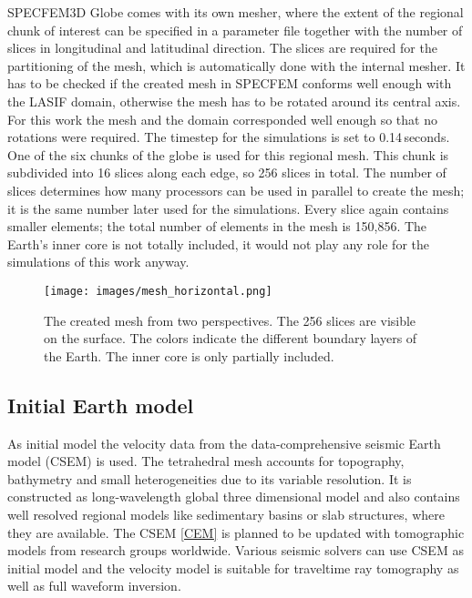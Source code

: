 SPECFEM3D Globe comes with its own mesher, where the extent of the regional chunk of interest can be 
specified in a parameter file together with the number of slices in longitudinal and latitudinal direction.
The slices are required for the partitioning of the mesh, which is automatically done with the internal mesher.
It has to be checked if the created mesh in SPECFEM conforms well enough with the LASIF domain, 
otherwise the mesh has to be rotated around its central axis.
For this work the mesh and the domain corresponded well enough so that no rotations were required.
The timestep for the simulations is set to 0.14$\,$seconds.  
One of the six chunks of the globe is used for this regional mesh.
This chunk is subdivided into 16 slices along each edge, so 256 slices in total.
The number of slices determines how many processors can
be used in parallel to create the mesh; 
it is the same number later used for the simulations. 
Every slice again contains smaller elements; the total number of elements in the mesh 
is 150,856. The Earth's inner core is not totally included, it would not play any role
for the simulations of this work anyway.

\begin{figure}[h]
\begin{center}
\texttt{[image: images/mesh\_horizontal.png]}
\caption[Overview of the mesh.]{The created mesh from two perspectives. The 256 slices are visible on the surface.
The colors indicate the different boundary layers of the Earth. The inner core is only partially
included. }
\label{mesh}
\end{center}
\end{figure}


\subsection{Initial Earth model}

As initial model the velocity data from the data-comprehensive seismic Earth model (CSEM) \citep{Afanasiev2014} is used.
The tetrahedral mesh accounts for topography, bathymetry and small heterogeneities due to its variable resolution.
It is constructed as long-wavelength global three dimensional model and also contains well resolved regional models
like sedimentary basins or slab structures, where they are available.
The CSEM \autoref{CEM} is planned to be updated with tomographic models from research groups worldwide.
Various seismic solvers can use CSEM as initial model and the velocity model is suitable for traveltime ray tomography as well as
full waveform inversion.

